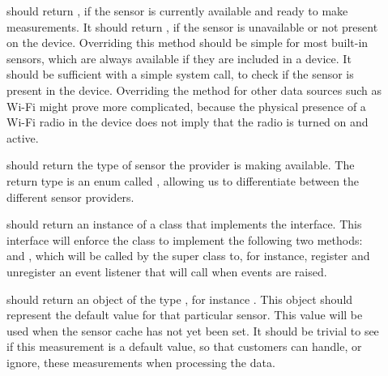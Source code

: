 \begin{description}
	\item[] should return , if the sensor is currently available and ready to make measurements. It should return , if the sensor is unavailable or not present on the device. Overriding this method should be simple for most built-in sensors, which are always available if they are included in a device. It should be sufficient with a simple system call, to check if the sensor is present in the device. Overriding the method for other data sources such as Wi-Fi might prove more complicated, because the physical presence of a Wi-Fi radio in the device does not imply that the radio is turned on and active.

	\item[] should return the type of sensor the provider is making available. The return type is an enum called , allowing us to differentiate between the different sensor providers.

	\item[] should return an instance of a class that implements the  interface. This interface will enforce the class to implement the following two methods:  and , which will be called by the super class to, for instance, register and unregister an event listener that will call  when events are raised.

  \item[] should return an object of the type , for instance . This object should represent the default value for that particular sensor. This value will be used when the sensor cache has not yet been set. It should be trivial to see if this measurement is a default value, so that customers can handle, or ignore, these measurements when processing the data.
\end{description} 

